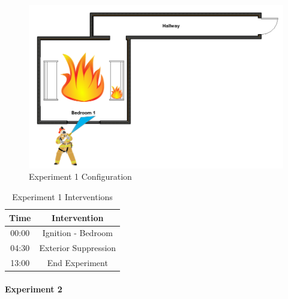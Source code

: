 \documentclass[12pt,oneside]{book}
\begin{document}
\begin{figure}[H]
	\centering
	\includegraphics[width=5in]{Howard_Exp_1.png}
	\caption{Experiment 1 Configuration}
	\label{fig:Exp1Config}
\end{figure}

\begin{table}[H]
	\centering
	\caption{Experiment 1 Interventions}
	\begin{tabular}{|c|c|} 
		\hline
		Time & Intervention \\ \hline \hline
		00:00 & Ignition - Bedroom \\ \hline
		04:30 & Exterior Suppression \\ \hline
		13:00 & End Experiment\\ \hline
	\end{tabular}
	\label{Table:Exp1Interventions}
\end{table}

\clearpage

\paragraph{Experiment 2} \mbox{}
\end{document}
